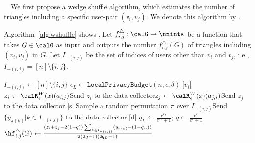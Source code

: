 {}~~We first 
propose a wedge shuffle algorithm, which estimates the number of triangles including a specific user-pair $(v_i,v_j)$. 
We denote this algorithm by \AlgWS{}. 

Algorithm~\ref{alg:wshuffle} shows \AlgWS{}. 
Let $f_{i,j}^\triangle: \calG \rightarrow \nnints$ be a function that takes $G \in \calG$ as input and outputs the number $f_{i,j}^\triangle(G)$ of triangles including $(v_i,v_j)$ in $G$. 
Let $I_{-(i,j)}$ be the set of indices of users other than $v_i$ and $v_j$, i.e., $I_{-(i,j)} = [n]\setminus\{i,j\}$. 

\setlength{\algomargin}{5mm}
\begin{algorithm}[t]
  \SetAlgoLined
  $I_{-(i,j)} \leftarrow [n]\setminus\{i,j\}$\;
  $\epsilon_L \leftarrow \texttt{LocalPrivacyBudget}(n,\epsilon,\delta)$\;
  [$v_i$] $z_i \leftarrow \calR_{\epsilon}^W(x)(a_{i,j})$\;
  [$v_i$] Send $z_i$ to the data collector\;
  [$v_j$] $z_j \leftarrow \calR_{\epsilon}^W(x)(a_{j,i})$\;
  [$v_j$] Send $z_j$ to the data collector\;
  [s] Sample a random permutation $\pi$ over $I_{-(i,j)}$\;
  [s] Send $\{y_{\pi(k)} | k \in I_{-(i,j)}\}$ to the data collector\;
  [d] $q_L \leftarrow \frac{e^{\epsilon_L}}{e^{\epsilon_L}+1}$; $q \leftarrow \frac{e^\epsilon}{e^\epsilon+1}$\;
  [d] $\hf_{i,j}^\triangle(G) \leftarrow \frac{(z_i+z_j-2(1-q))\sum_{k \in I_{-(i,j)}} (y_{\pi(k)} - (1-q_L))}{2(2q-1)(2q_L-1)}$\;
  \caption{Our wedge shuffle algorithm \AlgWS{}.
  [$v_i$], [s], [d] represent that the process is run by user $v_i$, the shuffler, and the data collector, respectively. 
  }\label{alg:wshuffle}
\end{algorithm}

